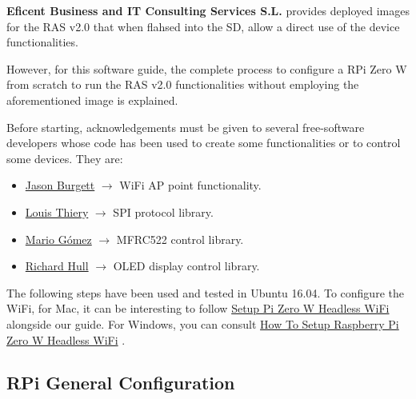\documentclass[12pt,a4paper,oneside]{article} %
\begin{document}
\textbf{Eficent Business and IT Consulting Services S.L.} provides deployed images for the RAS v2.0 that when flahsed into the SD, allow a direct use of the device functionalities.

However, for this software guide, the complete process to configure a RPi Zero W from scratch to run the RAS v2.0 functionalities without employing the aforementioned image is explained.

Before starting, acknowledgements must be given to several free-software developers whose code has been used to create some functionalities or to control some devices. They are:

\begin{itemize}
	\item \href{https://github.com/jasbur/RaspiWiFi/tree/master}{Jason Burgett} $\rightarrow$ WiFi AP point functionality.
	\item \href{https://github.com/lthiery/SPI-Py}{Louis Thiery} $\rightarrow$ SPI protocol library.
	\item \href{https://github.com/mxgxw/MFRC522-python}{Mario Gómez} $\rightarrow$ MFRC522 control library. 
	\item \href{https://github.com/rm-hull/luma.examples}{Richard Hull} $\rightarrow$ OLED display control library.
\end{itemize}

The following steps have been used and tested in Ubuntu 16.04. To configure the WiFi, for Mac, it can be interesting to follow \href{https://desertbot.io/blog/setup-pi-zero-w-headless-wifi}{Setup Pi Zero W Headless WiFi} \citep{mac} alongside our guide. For Windows, you can consult \href{https://core-electronics.com.au/tutorials/raspberry-pi-zerow-headless-wifi-setup.html}{How To Setup Raspberry Pi Zero W Headless WiFi} \citep{windows}.

\subsection{RPi General Configuration}
\end{document}

